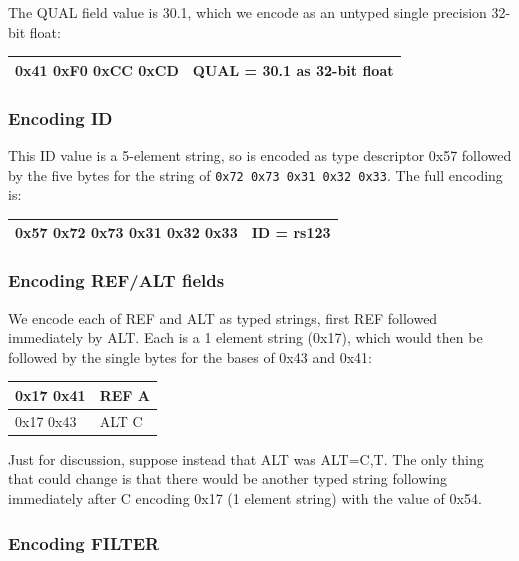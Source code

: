 \documentclass[8pt]{article}
\begin{document}
The QUAL field value is 30.1, which we encode as an untyped single precision 32-bit float:

\vspace{0.3cm}
\begin{tabular}{|l| l|} \hline
0x41 0xF0 0xCC 0xCD & QUAL = 30.1 as 32-bit float \\ \hline
\end{tabular}

\subsubsection{Encoding ID}

This ID value is a 5-element string, so is encoded as type descriptor 0x57 followed by the five bytes for the string of {\tt 0x72 0x73 0x31 0x32 0x33}.
The full encoding is:

\vspace{0.3cm}
\begin{tabular}{|l| l|} \hline
0x57 0x72 0x73 0x31 0x32 0x33 & ID = rs123 \\ \hline
\end{tabular}

\subsubsection{Encoding REF/ALT fields}

We encode each of REF and ALT as typed strings, first REF followed immediately by ALT.
Each is a 1 element string (0x17), which would then be followed by the single bytes for the bases of 0x43 and 0x41:

\vspace{0.3cm}
\begin{tabular}{|l| l|} \hline
0x17 0x41 & REF A \\ \hline
0x17 0x43 & ALT C \\ \hline
\end{tabular}

\vspace{0.3cm}
Just for discussion, suppose instead that ALT was ALT=C,T.
The only thing that could change is that there would be another typed string following immediately after C encoding 0x17 (1 element string) with the value of 0x54.

\subsubsection{Encoding FILTER}
\end{document}
